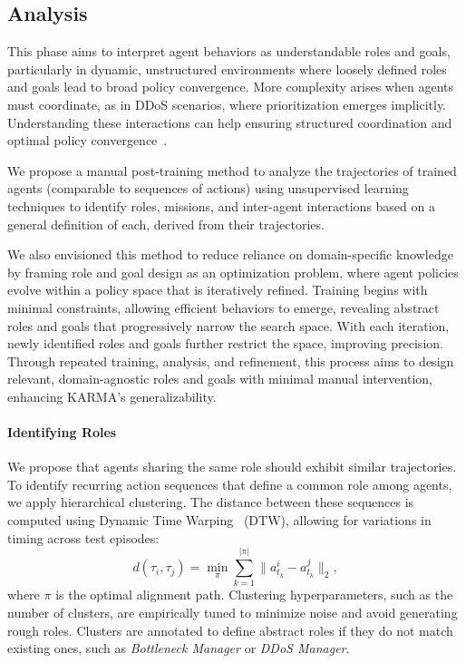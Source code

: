 \subsection{Analysis}
\label{sec:analysis}

This phase aims to interpret agent behaviors as understandable roles and goals, particularly in dynamic, unstructured environments where loosely defined roles and goals lead to broad policy convergence. More complexity arises when agents must coordinate, as in DDoS scenarios, where prioritization emerges implicitly. Understanding these interactions can help ensuring structured coordination and optimal policy convergence~\cite{Shoham2009MAS}.

We propose a manual post-training method to analyze the trajectories of trained agents (comparable to sequences of actions) using unsupervised learning techniques to identify roles, missions, and inter-agent interactions based on a general definition of each, derived from their trajectories.

We also envisioned this method to reduce reliance on domain-specific knowledge by framing role and goal design as an optimization problem, where agent policies evolve within a policy space that is iteratively refined. Training begins with minimal constraints, allowing efficient behaviors to emerge, revealing abstract roles and goals that progressively narrow the search space. With each iteration, newly identified roles and goals further restrict the space, improving precision. Through repeated training, analysis, and refinement, this process aims to design relevant, domain-agnostic roles and goals with minimal manual intervention, enhancing KARMA's generalizability.

\paragraph*{\textbf{Identifying Roles}}

We propose that agents sharing the same role should exhibit similar trajectories. To identify recurring action sequences that define a common role among agents, we apply hierarchical clustering. The distance between these sequences is computed using Dynamic Time Warping~\cite{berndt1994using} (DTW), allowing for variations in timing across test episodes:
\[
  d(\tau_i, \tau_j) = \min_{\pi} \sum_{k=1}^{|\pi|} \|a_{t_k}^i - a_{t_k}^j\|_2,
\]
where $\pi$ is the optimal alignment path. Clustering hyperparameters, such as the number of clusters, are empirically tuned to minimize noise and avoid generating rough roles. Clusters are annotated to define abstract roles if they do not match existing ones, such as \textit{Bottleneck Manager} or \textit{DDoS Manager}.

